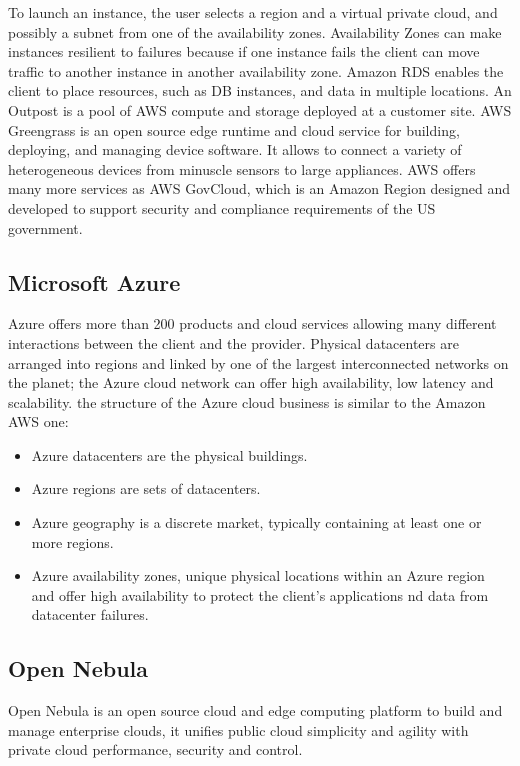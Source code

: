 To launch an instance, the user selects a region and a virtual private cloud, and possibly a subnet from one of the availability zones. Availability Zones can make instances resilient to failures because if one instance fails the client can move traffic to another instance in another availability zone. \n
Amazon RDS enables the client to place resources, such as DB instances, and data in multiple locations. \n
An Outpost is a pool of AWS compute and storage deployed at a customer site. \n
AWS Greengrass is an open source edge runtime and cloud service for building, deploying, and managing device software. It allows to connect a variety of heterogeneous devices from minuscle sensors to large appliances. \n
AWS offers many more services as AWS GovCloud, which is an Amazon Region designed and developed to support security and compliance requirements of the US government.
\subsection{Microsoft Azure}
Azure offers more than 200 products and cloud services allowing many different interactions between the client and the provider. \n
Physical datacenters are arranged into regions and linked by one of the largest interconnected networks on the planet; the Azure cloud network can offer high availability, low latency and scalability. \n
the structure of the Azure cloud business is similar to the Amazon AWS one:
\begin{itemize}
    \item Azure datacenters are the physical buildings.
    \item Azure regions are sets of datacenters.
    \item Azure geography is a discrete market, typically containing at least one or more regions.
    \item Azure availability zones, unique physical locations within an Azure region and offer high availability to protect the client's applications nd data from datacenter failures.
\end{itemize}
\subsection{Open Nebula}
Open Nebula is an open source cloud and edge computing platform to build and manage enterprise clouds, it unifies public cloud simplicity and agility with private cloud performance, security and control. \n